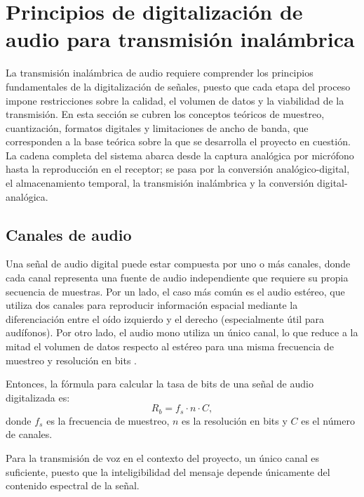 
\section{Principios de digitalización de audio para transmisión inalámbrica}

La transmisión inalámbrica de audio requiere comprender los principios fundamentales de la digitalización de señales, puesto que cada etapa del proceso impone restricciones sobre la calidad, el volumen de datos y la viabilidad de la transmisión.
En esta sección se cubren los conceptos teóricos de muestreo, cuantización, formatos digitales y limitaciones de ancho de banda, que corresponden a la base teórica sobre la que se desarrolla el proyecto en cuestión.
La cadena completa del sistema abarca desde la captura analógica por micrófono hasta la reproducción en el receptor; se pasa por la conversión analógico-digital, el almacenamiento temporal, la transmisión inalámbrica y la conversión digital-analógica.

\subsection{Canales de audio}

Una señal de audio digital puede estar compuesta por uno o más canales, donde cada canal representa una fuente de audio independiente que requiere su propia secuencia de muestras.
Por un lado, el caso más común es el audio estéreo, que utiliza dos canales para reproducir información espacial mediante la diferenciación entre el oído izquierdo y el derecho (especialmente útil para audífonos).
Por otro lado, el audio mono utiliza un único canal, lo que reduce a la mitad el volumen de datos respecto al estéreo para una misma frecuencia de muestreo y resolución en bits \cite{li2014}.

Entonces, la fórmula para calcular la tasa de bits de una señal de audio digitalizada es:
\begin{equation}
    R_{b} = f_s \cdot n \cdot C,
\end{equation}
donde $f_s$ es la frecuencia de muestreo, $n$ es la resolución en bits y $C$ es el número de canales.

Para la transmisión de voz en el contexto del proyecto, un único canal es suficiente, puesto que la inteligibilidad del mensaje depende únicamente del contenido espectral de la señal.

